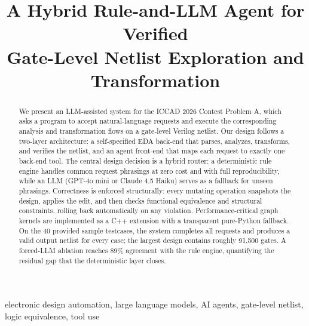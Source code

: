 \documentclass[conference]{IEEEtran}
\begin{document}
\title{A Hybrid Rule-and-LLM Agent for Verified\\
Gate-Level Netlist Exploration and Transformation}

\author{
\and
{}
}

\maketitle

\begin{abstract}
We present an LLM-assisted system for the ICCAD 2026 Contest Problem A,
which asks a program to accept natural-language requests and execute the
corresponding analysis and transformation flows on a gate-level Verilog
netlist. Our design follows a two-layer architecture: a self-specified
EDA back-end that parses, analyzes, transforms, and verifies the netlist,
and an agent front-end that maps each request to exactly one back-end tool.
The central design decision is a hybrid router: a deterministic rule engine
handles common request phrasings at zero cost and with full reproducibility,
while an LLM (GPT-4o mini or Claude 4.5 Haiku) serves as a fallback for
unseen phrasings. Correctness is enforced structurally: every mutating
operation snapshots the design, applies the edit, and then checks functional
equivalence and structural constraints, rolling back automatically on any
violation. Performance-critical graph kernels are implemented as a C++
extension with a transparent pure-Python fallback. On the 40 provided sample
testcases, the system completes all requests and produces a valid output
netlist for every case; the largest design contains roughly 91{,}500 gates.
A forced-LLM ablation reaches 89\% agreement with the rule engine, quantifying
the residual gap that the deterministic layer closes.
\end{abstract}

\begin{IEEEkeywords}
electronic design automation, large language models, AI agents,
gate-level netlist, logic equivalence, tool use
\end{IEEEkeywords}
\end{document}
